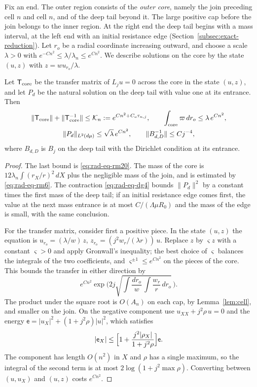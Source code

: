 Fix an end. The outer region consists of the \emph{outer core}, namely
the join preceding cell $n$ and cell $n$, and of the deep tail beyond
it. The large positive cap before the join belongs to the inner
region. At the right end the deep tail begins with a mass interval, at
the left end with an initial resistance edge
(Section~\ref{subsec:exact-reduction}). Let $r_o$ be a radial
coordinate increasing outward, and choose a scale $\lambda>0$ with
$e^{-Cn^2}\le\lambda/\lambda_n\le e^{Cn^2}$. We describe solutions on
the core by the state $(u,z)$ with $z=wu_{r_o}/\lambda$.

\begin{lemma}
\label{lem:transition-inputs}
Let $\mathsf T_{\rm core}$ be the transfer matrix of $L_ju=0$ across
the core in the state $(u,z)$, and let $P_d$ be the natural solution
on the deep tail with value one at its entrance. Then
\begin{equation}\label{eq:transition-inputs-new}
 \begin{gathered}
 \|\mathsf T_{\rm core}\|+\|\mathsf T_{\rm core}^{-1}\|
 \le\mathcal K_n:=e^{Cn^2+C_o\tau_{n,j}},
 \qquad \int_{\rm core}\varpi\,dr_o\le\lambda\,e^{Cn^2},\\
 \|P_d\|_{L^2(d\mu)}\le\sqrt\lambda\,e^{Cn^2},
 \qquad \|B_{d,D}^{-1}\|\le Cj^{-4},
 \end{gathered}
\end{equation}
where $B_{d,D}$ is $B_j$ on the deep tail with the Dirichlet condition
at its entrance.
\end{lemma}

\begin{proof}
The last bound is \eqref{eq:rad-eq-rm20}. The mass of the core is
$12\lambda_n\int(r_X/r)^2\,dX$ plus the negligible mass of the join,
and is estimated by \eqref{eq:rad-eq-rm6}. The contraction
\eqref{eq:rad-eq-dg4} bounds $\|P_d\|^2$ by a constant times the
first mass of the deep tail; if an initial resistance edge comes
first, the value at the next mass entrance is at most
$C/(\Lambda\mu R_0)$ and the mass of the edge is small, with the same
conclusion.

For the transfer matrix, consider first a positive piece. In the
state $(u,z)$ the equation is $u_{r_o}=(\lambda/w)\,z$,
$z_{r_o}=(j^2w_r/(\lambda r))\,u$. Replace $z$ by $\varsigma z$ with
a constant $\varsigma>0$ and apply Gronwall's inequality; the best
choice of $\varsigma$ balances the integrals of the two coefficients,
and $\varsigma^{\pm1}\le e^{Cn^2}$ on the pieces of the core. This
bounds the transfer in either direction by
\[
 e^{Cn^2}\exp\biggl(2j\sqrt{\int\frac{dr_o}{w}\,
                                  \int\frac{w_r}{r}\,dr_o}\,\biggr).
\]
The product under the square root is $O(A_n)$ on each cap, by
Lemma~\ref{lem:cell}, and smaller on the join. On the negative
component use $u_{XX}+j^2\rho\,u=0$ and the energy
$\mathsf e=|u_X|^2+(1+j^2\rho)|u|^2$, which satisfies
\[
 |\mathsf e_X|\le\Bigl[1+\frac{j^2|\rho_X|}{1+j^2\rho}\Bigr]\mathsf e .
\]
The component has length $O(n^2)$ in $X$ and $\rho$ has a single
maximum, so the integral of the second term is at most
$2\log(1+j^2\max\rho)$. Converting between $(u,u_X)$ and $(u,z)$ costs
$e^{Cn^2}$.
\end{proof}

